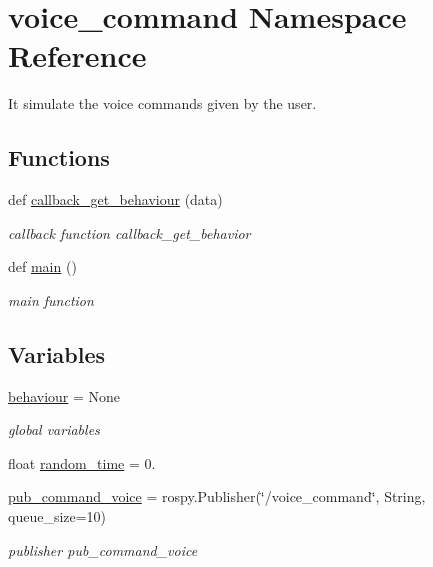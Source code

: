 \hypertarget{namespacevoice__command}{}\section{voice\+\_\+command Namespace Reference}
\label{namespacevoice__command}


It simulate the voice commands given by the user.  


\subsection*{Functions}
\begin{DoxyCompactItemize}
\item 
def \hyperlink{namespacevoice__command_a1a3b92c0f5ea62bc2f27000e4989c852}{callback\+\_\+get\+\_\+behaviour} (data)
\begin{DoxyCompactList}\small\item\em callback function callback\+\_\+get\+\_\+behavior \end{DoxyCompactList}\item 
def \hyperlink{namespacevoice__command_a069123617bd541e9f291626ba8882858}{main} ()
\begin{DoxyCompactList}\small\item\em main function \end{DoxyCompactList}\end{DoxyCompactItemize}
\subsection*{Variables}
\begin{DoxyCompactItemize}
\item 
\hyperlink{namespacevoice__command_a72126e703aca1aefdf96b1e11085ed89}{behaviour} = None
\begin{DoxyCompactList}\small\item\em global variables \end{DoxyCompactList}\item 
float \hyperlink{namespacevoice__command_a43a92e567eb4143c1efb09aff88f4916}{random\+\_\+time} = 0.
\item 
\hyperlink{namespacevoice__command_a893d30fba12eb55a21111bdc1bab61d6}{pub\+\_\+command\+\_\+voice} = rospy.\+Publisher(\char`\"{}/voice\+\_\+command\char`\"{}, String, queue\+\_\+size=10)
\begin{DoxyCompactList}\small\item\em publisher pub\+\_\+command\+\_\+voice \end{DoxyCompactList}\end{DoxyCompactItemize}


